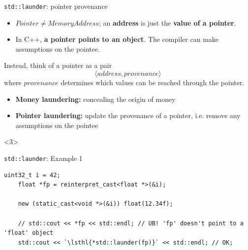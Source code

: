 \begin{frame}{\texttt{std::launder}: pointer provenance}
  \begin{itemize}
  \item $Pointer \neq MemoryAddress$; an \textbf{address} is just the \textbf{value of a pointer}.

  \item In C++, \textbf{a pointer points to an object}. The compiler can make assumptions on the pointee.
  \end{itemize}

  Instead, think of a pointer as a pair
  \begin{equation*}
    \langle address, provenance \rangle
  \end{equation*}
  where $provenance$ determines which values can be reached through the pointer.
  \vfill
  \pause

  \begin{itemize}
  \item \textbf{Money laundering:} concealing the origin of money
  \item \textbf{Pointer laundering:} update the provenance of a pointer, i.e. remove any assumptions on the pointee
  \end{itemize}

  \begin{onlyenv}<3>
  \end{onlyenv}
\end{frame}

\begin{frame}[fragile]{\texttt{std::launder}: Example 1}
  \begin{lstlisting}[style=c++]
    uint32_t i = 42;
    float *fp = reinterpret_cast<float *>(&i);

    new (static_cast<void *>(&i)) float(12.34f);

    // std::cout << *fp << std::endl; // UB! 'fp' doesn't point to a 'float' object
    std::cout << `\lsthl{*std::launder(fp)}` << std::endl; // OK; 
  \end{lstlisting}
\end{frame}


